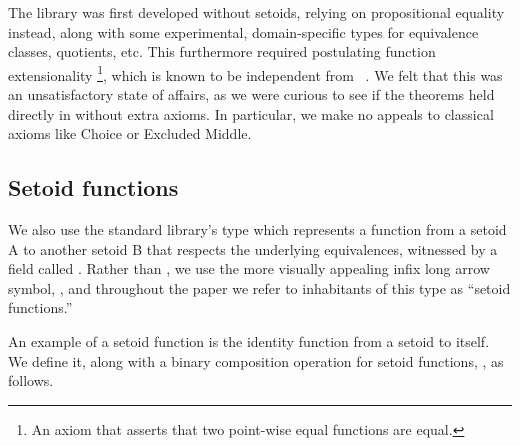 The \agdaalgebras library was first developed without setoids, relying on
propositional equality  instead,
along with some experimental, domain-specific types for equivalence classes, quotients, etc.
This furthermore required postulating function extensionality%
\footnote{An axiom that asserts that two point-wise equal functions are equal.}, which is
known to be independent from \mltt~\cite{MHE, MHE:2019}. We felt that this was
an unsatisfactory state of affairs, as we were curious to see if the theorems
held directly in \mltt without extra axioms.
In particular, we make no appeals to classical axioms like Choice or Excluded Middle.


\subsection{Setoid functions}
\label{setoid-functions}
We also use the standard library's  type which represents a function from
a setoid \ab A to another setoid \ab B that respects the underlying equivalences,
witnessed by a field called .  Rather than
, we use the more visually appealing infix long arrow symbol,
, and  throughout the paper we
refer to inhabitants of this type as ``setoid functions.''

\ifshort\else
An example of a setoid function is the identity function from a setoid to itself.
We define it, along with a binary composition operation for setoid functions,
, as follows.

